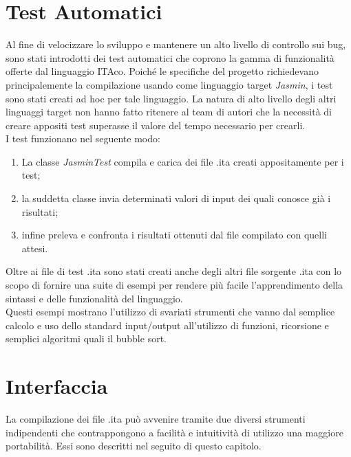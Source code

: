 \documentclass[11pt, a4paper, twoside, notitlepage]{report}
\begin{document}
\section{Test Automatici}
Al fine di velocizzare lo sviluppo e mantenere un alto livello di controllo sui
bug, sono stati introdotti dei test automatici che coprono la gamma di
funzionalità offerte dal linguaggio ITAco. Poiché le specifiche del progetto
richiedevano principalemente la compilazione usando come linguaggio target
\emph{Jasmin}, i test sono stati creati ad hoc per tale linguaggio. La natura di
alto livello degli altri linguaggi target non hanno fatto ritenere al team di
autori che la necessità di creare appositi test superasse il valore del tempo
necessario per crearli.
\\I test funzionano nel seguente modo:
\begin{enumerate}
  \item La classe \emph{JasminTest} compila e carica dei file .ita creati
  appositamente per i test;
  \item la suddetta classe invia determinati valori di input dei quali conosce
  già i risultati;
  \item infine preleva e confronta i risultati ottenuti dal file compilato con
  quelli attesi.
\end{enumerate}
Oltre ai file di test .ita sono stati creati anche degli altri file sorgente
.ita con lo scopo di fornire una suite di esempi per rendere più facile l'apprendimento della sintassi e delle
funzionalità del linguaggio.
\\Questi esempi mostrano l'utilizzo di svariati strumenti che vanno dal semplice
calcolo e uso dello standard input/output all'utilizzo di funzioni, ricorsione e
semplici algoritmi quali il bubble sort.

\section{Interfaccia}
\label{gui}
La compilazione dei file .ita può avvenire tramite due diversi strumenti
indipendenti che contrappongono a facilità e intuitività di utilizzo una
maggiore portabilità. Essi sono descritti nel seguito di questo capitolo.
\end{document}
